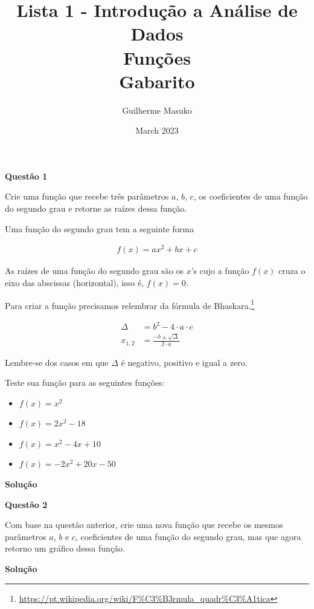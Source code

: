 \documentclass[12pt, a4paper]{article}
\title{Lista 1 - Introdução a Análise de Dados \\
Funções \\
Gabarito}
\author{Guilherme Masuko}
\date{March 2023}
\begin{document}
\clearpage
\maketitle
\thispagestyle{empty}

\textbf{Questão 1}

Crie uma função que recebe três parâmetros $a$, $b$, $c$, os coeficientes de uma função do segundo grau e retorne as raízes dessa função.

Uma função do segundo grau tem a seguinte forma 

\begin{align*}
	f(x) = ax^2 + bx + c
\end{align*}

As raízes de uma função do segundo grau são os $x$'s cujo a função $f(x)$ cruza o eixo das abscissas (horizontal), isso é, $f(x) = 0$.

Para criar a função precisamos relembrar da fórmula de Bhaskara.\footnote{\url{https://pt.wikipedia.org/wiki/F\%C3\%B3rmula_quadr\%C3\%A1tica}}

\begin{align*}
	\Delta &= b^2 -4\cdot a\cdot c \\
	x_{1,2} &= \frac{-b \pm \sqrt{\Delta}}{2\cdot a}
\end{align*}

Lembre-se dos casos em que $\Delta$ é negativo, positivo e igual a zero.

Teste sua função para as seguintes funções:

\begin{itemize}
	\item $f(x) = x^2$
	\item $f(x) = 2x^2 - 18$
	\item $f(x) = x^2 - 4x + 10$
	\item $f(x) = -2x^2 + 20x - 50$
\end{itemize}



\textbf{Solução}






\textbf{Questão 2}

Com base na questão anterior, crie uma nova função que recebe os mesmos parâmetros $a$, $b$ e $c$, coeficientes de uma função do segundo grau, mas que agora retorno um gráfico dessa função.



\textbf{Solução}
\end{document}
